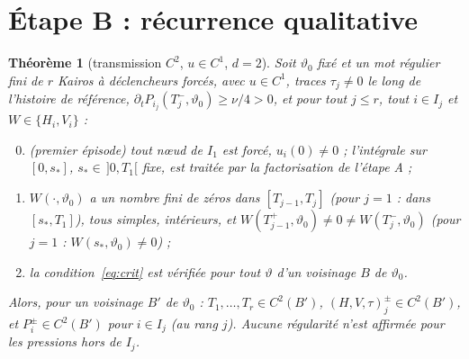 \documentclass[11pt,a4paper]{article}
\newtheorem{theoreme}{Théorème}
\theoremstyle{remark}
\newcommand{\vth}{\vartheta}
\begin{document}
\section{Étape B : récurrence qualitative}
\begin{theoreme}[transmission $C^2$, $u\in C^1$, $d=2$]\label{thm:T}
Soit $\vth_0$ fixé et un mot régulier fini de $r$ Kairos à déclencheurs forcés, avec $u\in C^1$, traces $\tau_j\neq0$ le long de l'histoire de référence, $\partial_tP_{i_j}(T_j^-,\vth_0)\ge\nu/4>0$, et pour tout $j\le r$, tout $i\in I_j$ et $W\in\{H_i,V_i\}$ :
\begin{enumerate}[nosep,label=(Z\arabic*)]
\setcounter{enumi}{-1}
\item (premier épisode) tout nœud de $I_1$ est forcé, $u_i(0)\ne0$ ; l'intégrale sur $[0,s_*]$, $s_*\in\,]0,T_1[$ fixe, est traitée par la factorisation de l'étape A ;
\item $W(\cdot,\vth_0)$ a un nombre fini de zéros dans $[T_{j-1},T_j]$ (pour $j=1$ : dans $[s_*,T_1]$), tous simples, intérieurs, et $W(T_{j-1}^+,\vth_0)\ne0\ne W(T_j^-,\vth_0)$ (pour $j=1$ : $W(s_*,\vth_0)\ne0$) ;
\item la condition~\eqref{eq:crit} est vérifiée pour tout $\vth$ d'un voisinage $B$ de $\vth_0$.
\end{enumerate}
Alors, pour un voisinage $B'$ de $\vth_0$ : $T_1,\dots,T_r\in C^2(B')$, $(H,V,\tau)_j^\pm\in C^2(B')$, et $P_i^\pm\in C^2(B')$ pour $i\in I_j$ (au rang $j$). Aucune régularité n'est affirmée pour les pressions hors de $I_j$.
\end{theoreme}
\end{document}
